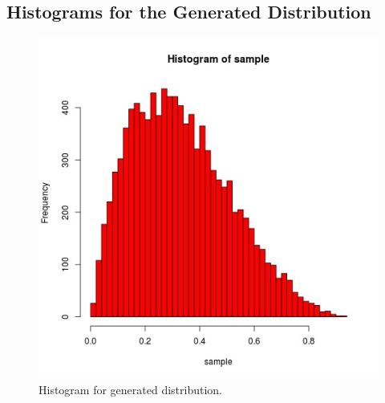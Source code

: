 \documentclass{article}
\begin{document}
		\subsection{Histograms for the Generated Distribution}
		\begin{figure}[!hb]
  			\includegraphics[width=\linewidth]{pic/que3_in_R.jpg}
 			 \caption{Histogram for generated  distribution. }
			\label{fig:hist2}
		\end{figure}
		
		\pagebreak
\end{document}
